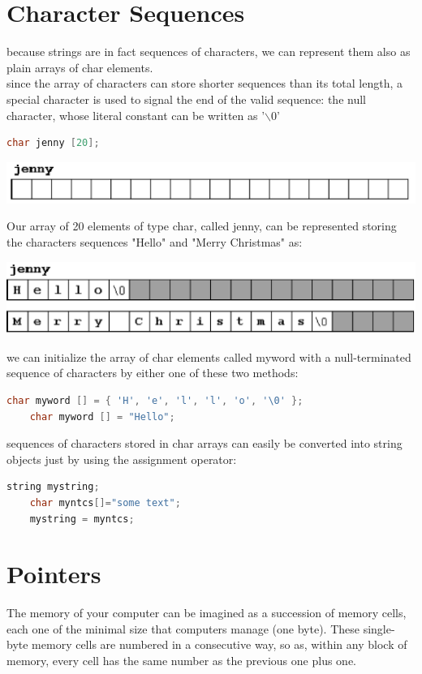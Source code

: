 \documentclass[12pt,oneside]{book}
\begin{document}
\section{Character Sequences}
because strings are in fact sequences of characters, we can represent them also as plain arrays of char elements.\\
since the array of characters can store shorter sequences than its total length, a special character is used to signal the end of the valid sequence: the null character, whose literal constant can be written as '$\backslash$0'\\
\begin{lstlisting}[language=C++]
    char jenny [20];
\end{lstlisting}
\begin{center}
	\includegraphics[width=0.5\linewidth]{../pic/3316/29.png}
\end{center}
Our array of 20 elements of type char, called jenny, can be represented storing the characters sequences "Hello" and "Merry Christmas" as:
\begin{center}
	\includegraphics[width=0.5\linewidth]{../pic/3316/30.png}
\end{center}
we can initialize the array of char elements called myword with a null-terminated sequence of characters by either one of these two methods:
\begin{lstlisting}[language=C++]
    char myword [] = { 'H', 'e', 'l', 'l', 'o', '\0' };
    char myword [] = "Hello";
\end{lstlisting}
sequences of characters stored in char arrays can easily be converted into string objects just by using the assignment operator:
\begin{lstlisting}[language=C++]
    string mystring; 
    char myntcs[]="some text";
    mystring = myntcs; 
\end{lstlisting}
\section{Pointers}
The memory of your computer can be imagined as a succession of memory cells, each one of the minimal size that computers manage (one byte). These single-byte memory cells are numbered in a consecutive way, so as, within any block of memory, every cell has the same number as the previous one plus one.\\
\end{document}
